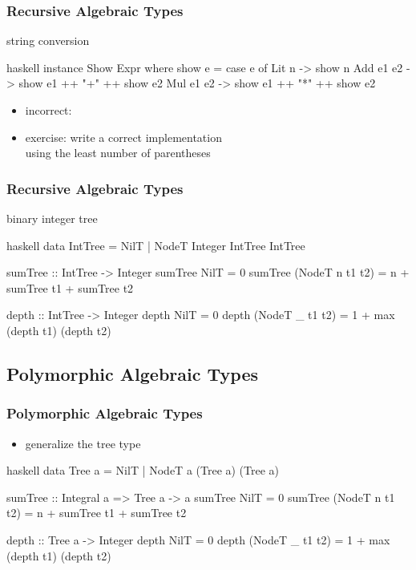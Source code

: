 \documentclass[dvipsnames]{beamer}
\theoremstyle{plain}
\begin{document}
\begin{frame}[fragile]
  \frametitle{Recursive Algebraic Types}

  \begin{exampleblock}{string conversion}
    \begin{pygments}{haskell}
instance Show Expr where
  show e =
    case e of
      Lit n     -> show n
      Add e1 e2 -> show e1 ++ "+" ++ show e2
      Mul e1 e2 -> show e1 ++ "*" ++ show e2
    \end{pygments}
  \end{exampleblock}

  \pause
  \begin{itemize}
    \item incorrect:
    \item exercise: write a correct implementation\\
      using the least number of parentheses
  \end{itemize}
\end{frame}

\begin{frame}[fragile]
  \frametitle{Recursive Algebraic Types}

  \begin{exampleblock}{binary integer tree}
    \begin{pygments}{haskell}
data IntTree = NilT | NodeT Integer IntTree IntTree

sumTree :: IntTree -> Integer
sumTree NilT            = 0
sumTree (NodeT n t1 t2) = n + sumTree t1 + sumTree t2

depth :: IntTree -> Integer
depth NilT            = 0
depth (NodeT _ t1 t2) = 1 + max (depth t1) (depth t2)
    \end{pygments}
  \end{exampleblock}
\end{frame}

\subsection{Polymorphic Algebraic Types}

\begin{frame}[fragile]
  \frametitle{Polymorphic Algebraic Types}

  \begin{itemize}
    \item generalize the tree type
  \end{itemize}

  \begin{exampleblock}{}
    \begin{pygments}{haskell}
data Tree a = NilT | NodeT a (Tree a) (Tree a)

sumTree :: Integral a => Tree a -> a
sumTree NilT            = 0
sumTree (NodeT n t1 t2) = n + sumTree t1 + sumTree t2

depth :: Tree a -> Integer
depth NilT            = 0
depth (NodeT _ t1 t2) = 1 + max (depth t1) (depth t2)
    \end{pygments}
  \end{exampleblock}
\end{frame}
\end{document}
